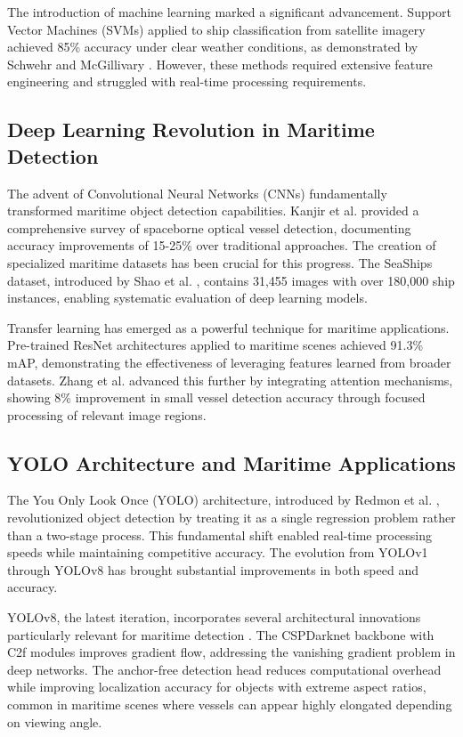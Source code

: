 \documentclass[10pt]{article}
\begin{document}
The introduction of machine learning marked a significant advancement. Support Vector Machines (SVMs) applied to ship classification from satellite imagery achieved 85\% accuracy under clear weather conditions, as demonstrated by Schwehr and McGillivary \cite{schwehr2007marine}. However, these methods required extensive feature engineering and struggled with real-time processing requirements.

\subsection{Deep Learning Revolution in Maritime Detection}

The advent of Convolutional Neural Networks (CNNs) fundamentally transformed maritime object detection capabilities. Kanjir et al. \cite{kanjir2018vessel} provided a comprehensive survey of spaceborne optical vessel detection, documenting accuracy improvements of 15-25\% over traditional approaches. The creation of specialized maritime datasets has been crucial for this progress. The SeaShips dataset, introduced by Shao et al. \cite{shao2018seaships}, contains 31,455 images with over 180,000 ship instances, enabling systematic evaluation of deep learning models.

Transfer learning has emerged as a powerful technique for maritime applications. Pre-trained ResNet architectures applied to maritime scenes achieved 91.3\% mAP, demonstrating the effectiveness of leveraging features learned from broader datasets. Zhang et al. \cite{zhang2021attention} advanced this further by integrating attention mechanisms, showing 8\% improvement in small vessel detection accuracy through focused processing of relevant image regions.

\subsection{YOLO Architecture and Maritime Applications}

The You Only Look Once (YOLO) architecture, introduced by Redmon et al. \cite{yolo2016}, revolutionized object detection by treating it as a single regression problem rather than a two-stage process. This fundamental shift enabled real-time processing speeds while maintaining competitive accuracy. The evolution from YOLOv1 through YOLOv8 has brought substantial improvements in both speed and accuracy.

YOLOv8, the latest iteration, incorporates several architectural innovations particularly relevant for maritime detection \cite{yolov8}. The CSPDarknet backbone with C2f modules improves gradient flow, addressing the vanishing gradient problem in deep networks. The anchor-free detection head reduces computational overhead while improving localization accuracy for objects with extreme aspect ratios, common in maritime scenes where vessels can appear highly elongated depending on viewing angle.
\end{document}
